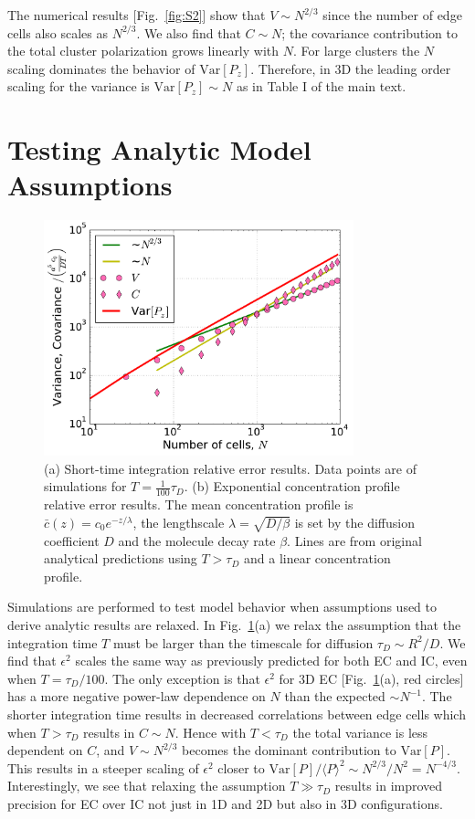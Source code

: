 The numerical results [Fig.\ \ref{fig:S2}] show that $V \sim N^{2/3}$ since the number of edge cells also scales as $N^{2/3}$. We also find that $C \sim N$; the covariance contribution to the total cluster polarization grows linearly with $N$. For large clusters the $N$ scaling dominates the behavior of $\text{Var}[P_z]$. Therefore, in 3D the leading order scaling for the variance is
$\text{Var}[P_z] \sim N$ as in Table I of the main text.


\section{Testing Analytic Model Assumptions}


\begin{figure}[ht]
    \centering
        \includegraphics[width=0.8\textwidth]{../fig/ch3_si2.pdf}
    \caption{(a) Short-time integration relative error results. Data points are of simulations for $T= \frac{1}{100} \tau_D$. (b) Exponential concentration profile relative error results. The mean concentration profile is $\bar{c}(z) = c_0 e^{-z/\lambda}$, the lengthscale $\lambda=\sqrt{D/\beta}$ is set by the diffusion coefficient $D$ and the molecule decay rate $\beta$. Lines are from original analytical predictions using $T > \tau_D$ and a linear concentration profile.} \label{fig:S1}
\end{figure}

Simulations are performed to test model behavior when assumptions used to derive analytic results are relaxed. In Fig.\ \ref{fig:S1}(a) we relax the assumption that the integration time $T$ must be larger than the timescale for diffusion $\tau_D \sim R^2/D$. We find that $\epsilon^2$ scales the same way as previously predicted for both EC and IC, even when $T = \tau_D/100$. The only exception is that $\epsilon^2$ for 3D EC [Fig.\ \ref{fig:S1}(a), red circles] has a more negative power-law dependence on $N$ than the expected $\sim N^{-1}$. The shorter integration time results in decreased correlations between edge cells which when $T>\tau_D$ results in $C\sim N$. Hence with
$T < \tau_D$
the total variance is less dependent on $C$, and $V \sim N^{2/3}$ becomes the dominant contribution to $\text{Var}[P]$. This results in a steeper scaling of $\epsilon^2$ closer to
$\text{Var}[P]/\langle P \rangle^2 \sim N^{2/3}/N^2 = N^{-4/3}$.
Interestingly, we see that relaxing the assumption $T \gg \tau_D$ results in improved precision for EC over IC not just in 1D and 2D but also in 3D configurations.

